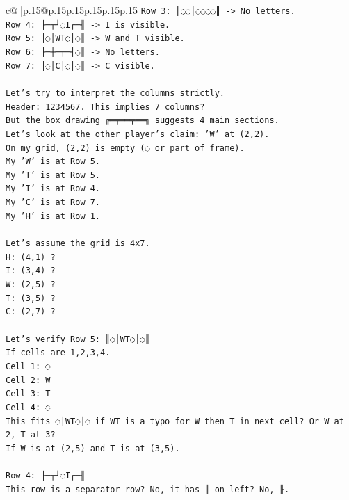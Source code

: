 \documentclass{article}
\begin{document}
{\begin{supertabular}{c@{$\;$}|p{.15\linewidth}@{}p{.15\linewidth}p{.15\linewidth}p{.15\linewidth}p{.15\linewidth}p{.15\linewidth}}
{{{\texttt{Row 3: ║◌◌│◌◌◌◌║ {-}> No letters.} \\
\texttt{Row 4: ╟─┬┘◌I┌─╢ {-}> I is visible.} \\
\texttt{Row 5: ║◌│WT◌│◌║ {-}> W and T visible.} \\
\texttt{Row 6: ╟─┼─┬─┤◌║ {-}> No letters.} \\
\texttt{Row 7: ║◌│C│◌│◌║ {-}> C visible.} \\
\\ 
\texttt{Let's try to interpret the columns strictly.} \\
\texttt{Header: 1234567. This implies 7 columns?} \\
\texttt{But the box drawing ╔═╤══╤══╗ suggests 4 main sections.} \\
\texttt{Let's look at the other player's claim: 'W' at (2,2).} \\
\texttt{On my grid, (2,2) is empty (◌ or part of frame).} \\
\texttt{My 'W' is at Row 5.} \\
\texttt{My 'T' is at Row 5.} \\
\texttt{My 'I' is at Row 4.} \\
\texttt{My 'C' is at Row 7.} \\
\texttt{My 'H' is at Row 1.} \\
\\ 
\texttt{Let's assume the grid is 4x7.} \\
\texttt{H: (4,1) ?} \\
\texttt{I: (3,4) ?} \\
\texttt{W: (2,5) ?} \\
\texttt{T: (3,5) ?} \\
\texttt{C: (2,7) ?} \\
\\ 
\texttt{Let's verify Row 5: ║◌│WT◌│◌║} \\
\texttt{If cells are 1,2,3,4.} \\
\texttt{Cell 1: ◌} \\
\texttt{Cell 2: W} \\
\texttt{Cell 3: T} \\
\texttt{Cell 4: ◌} \\
\texttt{This fits ◌│WT◌│◌ if WT is a typo for W then T in next cell? Or W at 2, T at 3?} \\
\texttt{If W is at (2,5) and T is at (3,5).} \\
\\ 
\texttt{Row 4: ╟─┬┘◌I┌─╢} \\
\texttt{This row is a separator row? No, it has ║ on left? No, ╟.} \\
}}}
\end{supertabular}}
\end{document}
